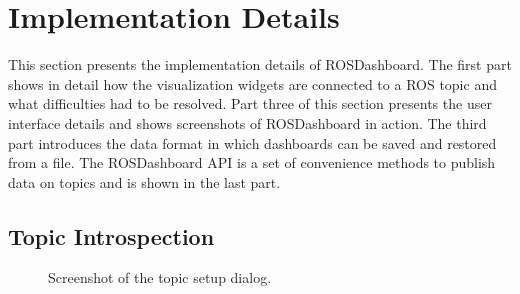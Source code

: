 \section{Implementation Details}
This section presents the implementation details of ROSDashboard. The first part shows in detail how the visualization widgets are connected to a ROS topic and what difficulties had to be resolved. Part three of this section presents the user interface details and shows screenshots of ROSDashboard in action. The third part introduces the data format in which dashboards can be saved and restored from a file. The ROSDashboard API is a set of convenience methods to publish data on topics and is shown in the last part.

\subsection{Topic Introspection}

\begin{figure}[thpb]
  \centering
  \caption{Screenshot of the topic setup dialog.}
  \label{topic setup screenshot}
\end{figure}

